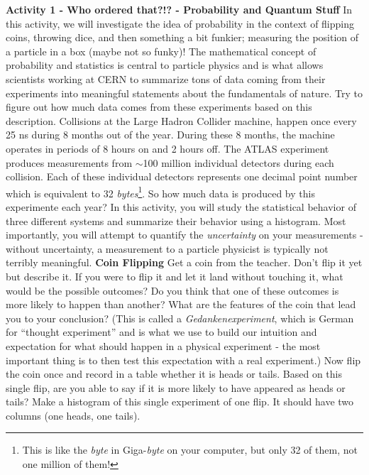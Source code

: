 \documentclass[12pt]{article}
\begin{document}
\textbf{Activity 1 - Who ordered that?!? - Probability and Quantum Stuff}
\newline
In this activity, we will investigate the idea of probability in the context of flipping coins, throwing dice, and then something a bit funkier; measuring the position of a particle in a box (maybe not so funky)!  The mathematical concept of probability and statistics is central to particle physics and is what allows scientists working at CERN to summarize tons of data coming from their experiments into meaningful statements about the fundamentals of nature. Try to figure out how much data comes from these experiments based on this description.  Collisions at the Large Hadron Collider machine, happen once every 25 ns during 8 months out of the year.  During these 8 months, the machine operates in periods of 8 hours on and 2 hours off.  The ATLAS experiment produces measurements from $\sim$100 million individual detectors during each collision.  Each of these individual detectors represents one decimal point number which is equivalent to 32 \textit{bytes}\footnote{This is like the \textit{byte} in Giga-\textit{byte} on your computer, but only 32 of them, not one million of them!}.  So how much data is produced by this experimente each year?
\newline
\newline
In this activity, you will study the statistical behavior of three different systems and summarize their behavior using a histogram.  Most importantly, you will attempt to quantify the \textit{uncertainty} on your measurements - without uncertainty, a measurement to a particle physicist is typically not terribly meaningful.  
\newline
\newline
\textbf{Coin Flipping}
\newline
Get a coin from the teacher.  Don't flip it yet but describe it.  If you were to flip it and let it land without touching it, what would be the possible outcomes?  Do you think that one of these outcomes is more likely to happen than another?  What are the features of the coin that lead you to your conclusion? (This is called a \textit{Gedankenexperiment}, which is German for “thought experiment” and is what we use to build our intuition and expectation for what should happen in a physical experiment - the most important thing is to then test this expectation with a real experiment.)
\newline
\newline
Now flip the coin once and record in a table whether it is heads or tails.  Based on this single flip, are you able to say if it is more likely to have appeared as heads or tails? Make a histogram of this single experiment of one flip.  It should have two columns (one heads, one tails). 
\end{document}
